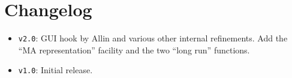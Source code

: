 \documentclass[a4paper,10pt]{article}
\begin{document}



\section*{Changelog}
\begin{itemize}
\item \texttt{v2.0}: GUI hook by Allin and various other internal
  refinements. Add the ``MA representation'' facility and the two
  ``long run'' functions.
\item \texttt{v1.0}: Initial release.
\end{itemize}
\end{document}
